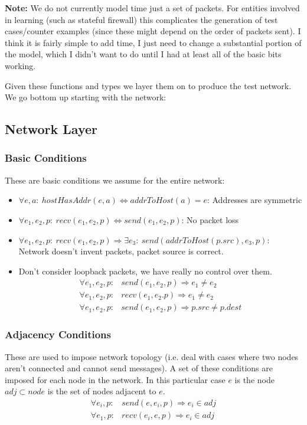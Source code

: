 \textbf{Note:} We do not currently model time just a set of packets. For entities involved in learning (such as stateful
firewall) this complicates the generation of test cases/counter examples (since these might depend on the order of
packets sent). I think it is fairly simple to add time, I just need to change a substantial portion of the model, which
I didn't want to do until I had at least all of the basic bits working.

Given these functions and types we layer them on to produce the test network. We go bottom up starting with the network:

\subsection{Network Layer}
\subsubsection{Basic Conditions}
These are basic conditions we assume for the entire network:
\begin{itemize}
\item $\forall e, a:\ hostHasAddr(e, a)\iff addrToHost(a) = e$: Addresses are symmetric
\item $\forall e_1, e_2, p:\ recv(e_1, e_2, p) \iff send(e_1, e_2, p)$: No packet loss
\item $\forall e_1, e_2, p:\ recv(e_1, e_2, p) \Rightarrow \exists e_3:\ send(addrToHost(p.src), e_3, p)$: Network doesn't
invent packets, packet source is correct.
\item Don't consider loopback packets, we have really no control over them.
\begin{align*}
\forall e_1, e_2, p:& send(e_1, e_2, p) \Rightarrow e_1 \neq e_2\\
\forall e_1, e_2, p:& recv(e_1, e_2. p) \Rightarrow e_1 \neq e_2\\
\forall e_1, e_2, p:& send(e_1, e_2, p) \Rightarrow p.src \neq p.dest
\end{align*}
\end{itemize}

\subsubsection{Adjacency Conditions}
These are used to impose network topology (i.e. deal with cases where two nodes aren't connected and cannot send
messages). A set of these conditions are imposed for each node in the network.
In this particular case $e$ is the node $adj \subset node$ is the set of nodes adjacent to $e$.
\begin{align*}
\forall e_i, p:& send(e, e_i, p) \Rightarrow e_i \in adj\\
\forall e_1, p:& recv(e_i, e, p) \Rightarrow e_i \in adj
\end{align*}


